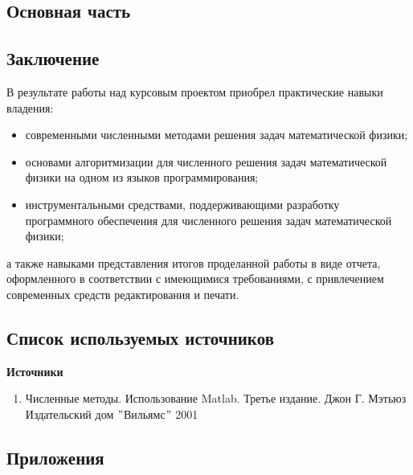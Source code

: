 \documentclass[14pt, titlepage, a4paper]{extarticle} %
\begin{document}
	
	\pagebreak
	
	
	\subsection*{Основная часть}
	
	
	\pagebreak
	
	
	\subsection*{Заключение}
	
	В результате работы над курсовым проектом приобрел практические навыки владения:
	\begin{itemize}
		\item современными численными методами решения задач математической физики;
		\item основами алгоритмизации для численного решения задач математической физики на одном из языков программирования;
		\item инструментальными средствами, поддерживающими разработку программного обеспечения для численного решения задач математической физики; 
	\end{itemize}
	а также навыками представления итогов проделанной работы в виде отчета, оформленного в соответствии с имеющимися требованиями, с привлечением современных средств редактирования и печати.
	
	\pagebreak

	
	\subsection*{Список используемых источников}
	
	\textbf{Источники}
	\begin{enumerate}
		\item Численные методы. Использование Matlab. Третье издание. Джон Г. Мэтьюз Издательский дом $"$Вильямс$"$ 2001
	\end{enumerate}
	
	\pagebreak
	
	
	\subsection*{Приложения}
	
	\pagebreak	
	
	
\end{document}
